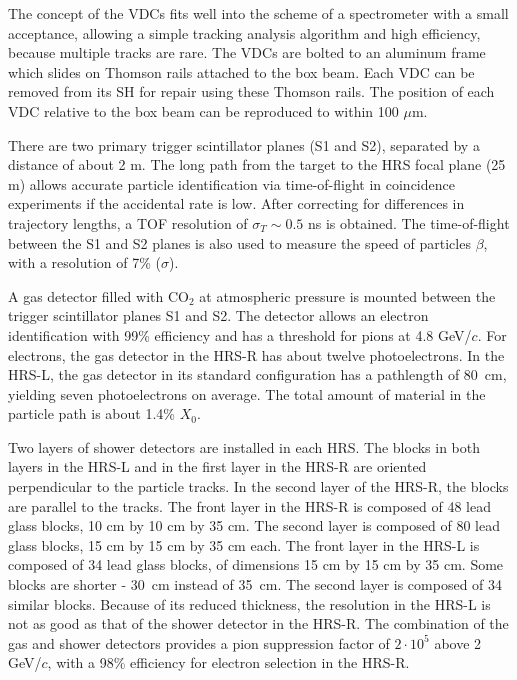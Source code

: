 {The concept of the VDCs fits well into the scheme of a spectrometer with a small 
acceptance, allowing a simple tracking analysis algorithm and high efficiency, 
because multiple tracks are rare.
The VDCs are bolted to an aluminum frame which slides on Thomson rails 
attached to the box beam. 
Each VDC can be removed from its SH for repair using these Thomson rails. 
The position of each VDC relative to the box beam can be reproduced to within 
100 $\mu$m. 

There are two primary trigger scintillator planes (S1 and S2), 
separated by a distance of about 2 m. 
The long path from the target to the HRS focal plane (25 m) allows 
accurate particle identification via time-of-flight in coincidence experiments 
if the accidental rate is low. 
After correcting for differences in trajectory lengths, 
a TOF resolution of $\sigma_T \sim 0.5$ ns is obtained. 
The time-of-flight between the S1 and S2 planes is also used to measure 
the speed of particles $\beta$, with a resolution of 7\% ($\sigma$).

A gas \Cherenkov{} detector filled  with CO$_{2}$ at atmospheric 
pressure is mounted between the trigger scintillator planes S1 and S2. 
The detector allows an electron identification  with 99\% efficiency
and has a threshold for pions at 4.8 GeV/$c$. 
For electrons, the gas \Cherenkov{} detector in the HRS-R has about twelve photoelectrons. 
In the HRS-L, the gas \Cherenkov{} detector in its standard configuration has 
a pathlength of 80~cm, yielding seven photoelectrons on average. 
The total amount of material in the particle path is about 1.4\% $X_0$. 

Two layers of shower detectors are installed in each HRS. 
The blocks in both layers in the HRS-L and in the first 
layer in the HRS-R are oriented perpendicular to the particle tracks. 
In the second layer of the HRS-R, the blocks are parallel to the tracks. 
The front layer in the HRS-R is composed of 48 lead glass blocks, 
10 cm by 10 cm by 35 cm. 
The second layer is composed of 80 lead glass blocks, 
15 cm by 15 cm by 35 cm each.  
The front layer in the HRS-L is composed of 34 lead glass blocks, of 
dimensions 15 cm by 15 cm by 35 cm. Some blocks are shorter - 30~cm 
instead of 35~cm. 
The second layer is  composed of 34 similar blocks. 
Because of its reduced thickness, the resolution in the HRS-L is not as good 
as that of the shower detector in the HRS-R.
The combination of the gas \Cherenkov{} and shower detectors provides a 
pion suppression factor of $2 \cdot 10^{5}$ above 2 GeV/$c$, with a 
98\% efficiency for electron selection in the HRS-R. 

}
